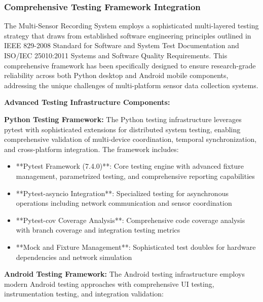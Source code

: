 \documentclass[11pt,a4paper]{report}
\begin{document}
\subsubsection{Comprehensive Testing Framework Integration}

The Multi-Sensor Recording System employs a sophisticated multi-layered testing strategy that draws from established
software engineering principles outlined in IEEE 829-2008 Standard for Software and System Test Documentation and
ISO/IEC 25010:2011 Systems and Software Quality Requirements. This comprehensive framework has been specifically
designed to ensure research-grade reliability across both Python desktop and Android mobile components, addressing the
unique challenges of multi-platform sensor data collection systems.

\textbf{Advanced Testing Infrastructure Components:}

\textbf{Python Testing Framework:}
The Python testing infrastructure leverages pytest with sophisticated extensions for distributed system testing,
enabling comprehensive validation of multi-device coordination, temporal synchronization, and cross-platform
integration. The framework includes:

\begin{itemize}
\item **Pytest Framework (7.4.0)**: Core testing engine with advanced fixture management, parametrized testing, and
  comprehensive reporting capabilities
\item **Pytest-asyncio Integration**: Specialized testing for asynchronous operations including network communication and
  sensor coordination
\item **Pytest-cov Coverage Analysis**: Comprehensive code coverage analysis with branch coverage and integration testing
  metrics
\item **Mock and Fixture Management**: Sophisticated test doubles for hardware dependencies and network simulation

\end{itemize}
\textbf{Android Testing Framework:}
The Android testing infrastructure employs modern Android testing approaches with comprehensive UI testing,
instrumentation testing, and integration validation:
\end{document}
